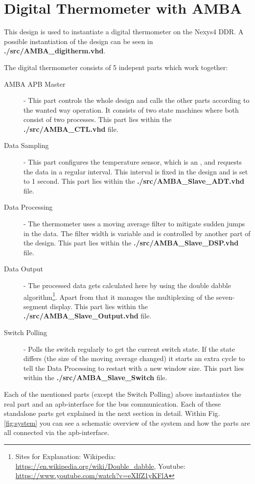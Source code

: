 \documentclass[%
	a4paper,
]
{article}
\begin{document}
\section{Digital Thermometer with AMBA}
\label{sec:characterization}

This design is used to instantiate a digital thermometer on the Nexys4 DDR.
A possible instantiation of the design can be seen in \textbf{./src/AMBA_digitherm.vhd}.


The digital thermometer consists of 5 indepent parts which work together:
\begin{description}
\item[AMBA APB Master] - This part controls the whole design and calls 
the other parts according to the wanted way operation. It consists of 
two state machines where both consist of two processes. This part lies within
the \mbox{\textbf{./src/AMBA_CTL.vhd}} file.
\item[Data Sampling] - This part configures the temperature sensor, which 
is an \autocite{ADT7420}, and requests the data in a regular interval. This interval 
is fixed in the design and is set to 1 second. This part lies within the 
\mbox{\textbf{./src/AMBA_Slave_ADT.vhd}} file.
\item[Data Processing] - The thermometer uses a moving average filter
to mitigate sudden jumps in the data. The filter width is variable and
is controlled by another part of the design. This part lies within the 
\mbox{\textbf{./src/AMBA_Slave_DSP.vhd}} file.
\item[Data Output] - The processed data gets calculated here by using the 
double dabble algorithm\footnote{Sites for Explanation: Wikipedia: \url{https://en.wikipedia.org/wiki/Double_dabble}, Youtube: \url{https://www.youtube.com/watch?v=eXIfZ1yKFlA}}. Apart from that
it manages the multiplexing of the seven-segment display. This part lies 
within the \mbox{\textbf{./src/AMBA_Slave_Output.vhd}} file.
\item[Switch Polling] - Polls the switch regularly to get the current switch
state. If the state differs (the size of the moving average changed) it starts
an extra cycle to tell the Data Processing to restart with a new window size.
This part lies within the \mbox{\textbf{./src/AMBA_Slave_Switch}} file.
\end{description}

Each of the mentioned parts (except the Switch Polling) above instantiates the real part and an apb\autocite{apb}-interface
for the bus communication. Each of these standalone parts get explained in the next 
section in detail. Within Fig.\ref{fig:system} you can see a schematic overview of the system
and how the parts are all connected via the apb-interface.
\end{document}
